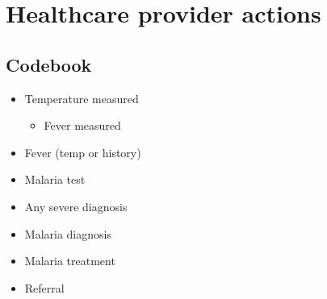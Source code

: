 \documentclass[
  letterpaper,
  DIV=11,
  numbers=noendperiod,
  oneside]{scrreprt}
\providecommand{\tightlist}{%
  \setlength{\itemsep}{0pt}\setlength{\parskip}{0pt}}\usepackage{longtable,booktabs,array}
\begin{document}
\hypertarget{healthcare-provider-actions}{%
\section{Healthcare provider
actions}\label{healthcare-provider-actions}}

\hypertarget{codebook-2}{%
\subsection{Codebook}\label{codebook-2}}

\begin{itemize}
\tightlist
\item
  Temperature measured

  \begin{itemize}
  \tightlist
  \item
    Fever measured
  \end{itemize}
\item
  Fever (temp or history)
\item
  Malaria test
\item
  Any severe diagnosis
\item
  Malaria diagnosis
\item
  Malaria treatment
\item
  Referral
\end{itemize}
\end{document}
